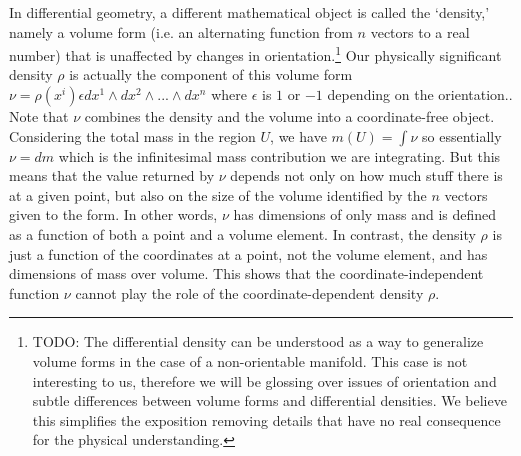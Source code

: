 \documentclass[letterpaper]{article}
\begin{document}
In differential geometry, a different mathematical object is called the `density,' namely a volume form (i.e. an alternating function from $n$ vectors to a real number) that is unaffected by changes in orientation.\footnote{TODO: The differential density can be understood as a way to generalize volume forms in the case of a non-orientable manifold. This case is not interesting to us, therefore we will be glossing over issues of orientation and subtle differences between volume forms and differential densities. We believe this simplifies the exposition removing details that have no real consequence for the physical understanding.} Our physically significant density $\rho$ is actually the component of this volume form $\nu = \rho(x^i)  \epsilon dx^1 \wedge dx^2 \wedge ... \wedge dx^n$ where $\epsilon$ is $1$ or $-1$ depending on the orientation.. Note that $\nu$ combines the density and the volume into a coordinate-free object. Considering the total mass in the region $U$, we have $m(U) = \int \nu$ so essentially $\nu = dm$ which is the infinitesimal mass contribution we are integrating. But this means that the value returned by $\nu$ depends not only on how much stuff there is at a given point, but also on the size of the volume identified by the $n$ vectors given to the form. In other words, $\nu$ has dimensions of only mass and is defined as a function of both a point and a volume element. In contrast, the density $\rho$ is just a function of the coordinates at a point, not the volume element, and has dimensions of mass over volume. This shows that the coordinate-independent function $\nu$ cannot play the role of the coordinate-dependent density $\rho$. 
\end{document}
